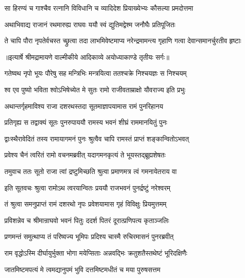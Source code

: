 \twolineshloka
{सा हिरण्यं च गाश्चैव रत्नानि विविधानि च}
{व्यादिदेश प्रियाख्येभ्यः कौसल्या प्रमदोत्तमा} %

\twolineshloka
{अथाभिवाद्य राजानं रथमारुह्य राघवः}
{ययौ स्वं द्युतिमद्वेश्म जनौघैः प्रतिपूजितः} %

\fourlineindentedshloka
{ते चापि पौरा नृपतेर्वचस्त}
{च्छ्रुत्वा तदा लाभमिवेष्टमाप्य}
{नरेन्द्रमामन्त्य गृहाणि गत्वा}
{ देवान्समानर्चुरतीव हृष्टाः} %


{॥इत्यार्षे श्रीमद्रामायणे वाल्मीकीये आदिकाव्ये अयोध्याकाण्डे तृतीयः सर्गः॥}


\twolineshloka
{गतेष्वथ नृपो भूयः पौरेषु सह मन्त्रिभिः}
{मन्त्रयित्वा ततश्चक्रे निश्चयज्ञः स निश्चयम्} %

\twolineshloka
{श्व एव पुष्यो भविता श्वोऽभिषेच्येत मे सुतः}
{रामो राजीवताम्राक्षो यौवराज्य इति प्रभुः} %

\twolineshloka
{अथान्तर्गृहमाविश्य राजा दशरथस्तदा}
{सूतमाज्ञापयामास रामं पुनरिहानय} %

\twolineshloka
{प्रतिगृह्य स तद्वाक्यं सूतः पुनरुपाययौ}
{रामस्य भवनं शीघ्रं राममानयितुं पुनः} %

\twolineshloka
{द्वाःस्थैरावेदितं तस्य रामायागमनं पुनः}
{श्रुत्वैव चापि रामस्तं प्राप्तं शङ्कान्वितोऽभवत्} %

\twolineshloka
{प्रवेश्य चैनं त्वरितं रामो वचनमब्रवीत्}
{यदागमनकृत्यं ते भूयस्तद्ब्रूह्यशेषतः} %

\twolineshloka
{तमुवाच ततः सूतो राजा त्वां द्रष्टुमिच्छति}
{श्रुत्वा प्रमाणमत्र त्वं गमनायेतराय वा} %

\twolineshloka
{इति सूतवचः श्रुत्वा रामोऽथ त्वरयान्वितः}
{प्रययौ राजभवनं पुनर्द्रष्टुं नरेश्वरम्} %

\twolineshloka
{तं श्रुत्वा समनुप्राप्तं रामं दशरथो नृपः}
{प्रवेशयामास गृहं विविक्षुः प्रियमुत्तमम्} %

\twolineshloka
{प्रविशन्नेव च श्रीमान्राघवो भवनं पितुः}
{ददर्श पितरं दूरात्प्रणिपत्य कृताञ्जलिः} %

\twolineshloka
{प्रणमन्तं समुत्थाप्य तं परिष्वज्य भूमिपः}
{प्रदिश्य चास्मै रुचिरमासनं पुनरब्रवीत्} %

\twolineshloka
{राम वृद्धोऽस्मि दीर्घायुर्भुक्ता भोगा मयेप्सिताः}
{अन्नवद्भिः क्रतुशतैस्तथेष्टं भूरिदक्षिणैः} %

\twolineshloka
{जातमिष्टमपत्यं मे त्वमद्यानुपमं भुवि}
{दत्तमिष्टमधीतं च मया पुरुषसत्तम} %

